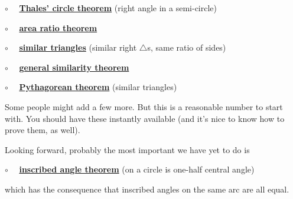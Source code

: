 \documentclass[11pt, oneside]{article}
\begin{document}
$\circ$ \ \ \hyperref[sec:Thales_theorem]{\textbf{Thales' circle theorem}} (right angle in a semi-circle)

$\circ$ \ \ \hyperref[sec:area_ratio_theorem]{\textbf{area ratio theorem}}

$\circ$ \ \  \hyperref[sec:similar_right_triangles]{\textbf{similar triangles}} (similar right $\triangle$s, same ratio of sides)

$\circ$ \ \ \hyperref[sec:similarity_and_ratios]{\textbf{general similarity theorem}}

$\circ$ \ \ \hyperref[sec:Pythagoras_similar_triangles]{\textbf{Pythagorean theorem}} (similar triangles)

Some people might add a few more.  But this is a reasonable number to start with.  You should have these instantly available (and it's nice to know how to prove them, as well).

Looking forward, probably the most important we have yet to do is

$\circ$ \ \ \hyperref[sec:peripheral_angle]{\textbf{inscribed angle theorem}} (on a circle is one-half central angle)

which has the consequence that inscribed angles on the same arc are all equal.
\end{document}
